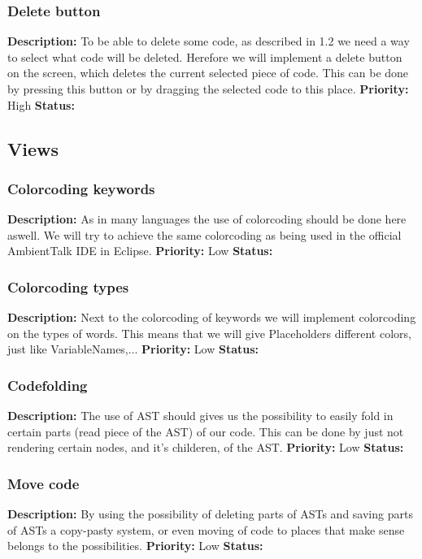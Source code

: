 \documentclass[a4paper,12pt]{report}
\begin{document}
\subsubsection{Delete button}
\textbf{Description: } To be able to delete some code, as described in 1.2 we need a way to select what code will be deleted. Herefore we will
implement a delete button on the screen, which deletes the current selected piece of code. This can be done by pressing this button or by dragging the selected code to this place. 
\textbf{Priority:} High \newline
\textbf{Status: } \newline
\subsection{Views}
\subsubsection{Colorcoding keywords}
\textbf{Description: }As in many languages the use of colorcoding should be done here aswell. We  will try to achieve the same colorcoding as
being used in the official AmbientTalk IDE in Eclipse. \newline
\textbf{Priority:} Low \newline
\textbf{Status: } \newline
\subsubsection{Colorcoding types}
\textbf{Description: } Next to the colorcoding of keywords we will implement colorcoding on the types of words. This means that we will give
Placeholders different colors, just like VariableNames,... \newline
\textbf{Priority:} Low \newline
\textbf{Status: } \newline
\subsubsection{Codefolding}
\textbf{Description: }The use of AST should gives us the possibility to easily fold in certain parts (read piece of the AST) of our code. This can be done by just not
rendering certain nodes, and it's childeren, of the AST. \newline
\textbf{Priority:} Low \newline
\textbf{Status: } \newline
\subsubsection{Move code}
\textbf{Description: } By using the possibility of deleting parts of ASTs and saving parts of ASTs a copy-pasty system, or even moving of code to places that make sense belongs
to the possibilities.\newline
\textbf{Priority:} Low \newline
\textbf{Status: } \newline
\end{document}
